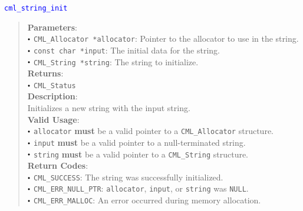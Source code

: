 \documentclass[a4paper,oneside,10pt]{article}
\newcommand{\function}[1]{
  \noindent\textcolor{blue}{\texttt{#1}}
  \vspace{-0.3em}
}
\renewcommand{\dot}{\raisebox{0.3ex}{\scalebox{0.6}{$\bullet$}}}
\theoremstyle{definition}
\begin{document}
\function{cml\_string\_init}
\begin{quote}
  \textbf{Parameters}: \\
  $\dot$ \texttt{CML\_Allocator *allocator}: Pointer to the allocator to use in the string. \\
  $\dot$ \texttt{const char *input}: The initial data for the string. \\
  $\dot$ \texttt{CML\_String *string}: The string to initialize. \\
  \textbf{Returns}: \\
  $\dot$ \texttt{CML\_Status} \\
  
  \vspace{-0.75em}
  \textbf{Description}: \\
  Initializes a new string with the input string. \\

  \vspace{-0.75em}
  \textbf{Valid Usage}: \\
  $\dot$ \texttt{allocator} \textbf{must} be a valid pointer to a \texttt{CML\_Allocator} structure. \\
  $\dot$ \texttt{input} \textbf{must} be a valid pointer to a null-terminated string. \\
  $\dot$ \texttt{string} \textbf{must} be a valid pointer to a \texttt{CML\_String} structure. \\

  \vspace{-0.75em}
  \textbf{Return Codes}: \\
  $\dot$ \texttt{CML\_SUCCESS}: The string was successfully initialized. \\
  $\dot$ \texttt{CML\_ERR\_NULL\_PTR}: \texttt{allocator}, \texttt{input}, or \texttt{string} was \texttt{NULL}. \\
  $\dot$ \texttt{CML\_ERR\_MALLOC}: An error occurred during memory allocation. \\
\end{quote}
\end{document}
